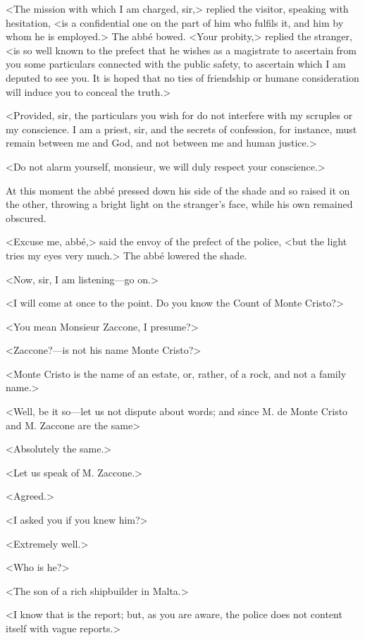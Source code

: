  <The mission with which I am charged, sir,> replied the visitor, speaking with hesitation, <is a confidential one on the part of him who fulfils it, and him by whom he is employed.> The abbé bowed. <Your probity,> replied the stranger, <is so well known to the prefect that he wishes as a magistrate to ascertain from you some particulars connected with the public safety, to ascertain which I am deputed to see you. It is hoped that no ties of friendship or humane consideration will induce you to conceal the truth.> 

 <Provided, sir, the particulars you wish for do not interfere with my scruples or my conscience. I am a priest, sir, and the secrets of confession, for instance, must remain between me and God, and not between me and human justice.> 

 <Do not alarm yourself, monsieur, we will duly respect your conscience.> 

 At this moment the abbé pressed down his side of the shade and so raised it on the other, throwing a bright light on the stranger's face, while his own remained obscured. 

 <Excuse me, abbé,> said the envoy of the prefect of the police, <but the light tries my eyes very much.> The abbé lowered the shade. 

 <Now, sir, I am listening—go on.> 

 <I will come at once to the point. Do you know the Count of Monte Cristo?> 

 <You mean Monsieur Zaccone, I presume?> 

 <Zaccone?—is not his name Monte Cristo?> 

 <Monte Cristo is the name of an estate, or, rather, of a rock, and not a family name.> 

 <Well, be it so—let us not dispute about words; and since M. de Monte Cristo and M. Zaccone are the same\longdash> 

 <Absolutely the same.> 

 <Let us speak of M. Zaccone.> 

 <Agreed.> 

 <I asked you if you knew him?> 

 <Extremely well.> 

 <Who is he?> 

 <The son of a rich shipbuilder in Malta.> 

 <I know that is the report; but, as you are aware, the police does not content itself with vague reports.> 

